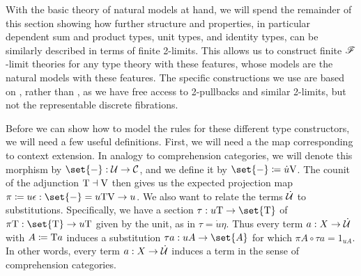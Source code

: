 \documentclass[../thesis.tex]{subfiles}
\begin{document}
With the basic theory of natural models at hand, we will spend the remainder of this section showing how further
structure and properties, in particular dependent sum and product types, unit types, and identity types, can
be similarly described in terms of finite 2-limits. This allows us to construct finite ${\mathscr{F}}$-limit theories
for any type theory with these features, whose models are the natural models with these features. The specific
constructions we use are based on \cite{coraglia2024a}, rather than \cite{awodey2017}, as we have free access
to 2-pullbacks and similar 2-limits, but not the representable discrete fibrations.

Before we can show how to model the rules for these different type constructors, we will need a few useful definitions.
First, we will need a the map corresponding to context extension. In analogy to comprehension categories, we will denote
this morphism by $\set{-} : \cU \to \cC$, and we define it by $\set{-} \coloneq \dot u \var$. The counit of the adjunction
${{\mathrm{T}}} \dashv {{\mathrm{V}}}$ then gives us the expected projection map $\pi \coloneq u \epsilon : \set{-} = u\typ\var \to u$. We also
want to relate the terms $\dot{{\mathcal{U}}}$ to substitutions. Specifically, we have a section $\tau : u\typ \to \set{\typ}$ of $\pi
\typ : \set{\typ} \to u\typ$ given by the unit, as in $\tau = \dot u \eta$. Thus every term $a : X \to \dot{{\mathcal{U}}}$ with $A
\coloneq {{\mathrm{T}}} a$ induces a substitution $\tau a : uA \to \set{A}$ for which $\pi A \circ \tau a = 1_{u A}$. In other words,
every term $a : X \to \dot{{\mathcal{U}}}$ induces a term in the sense of comprehension categories.
\end{document}
